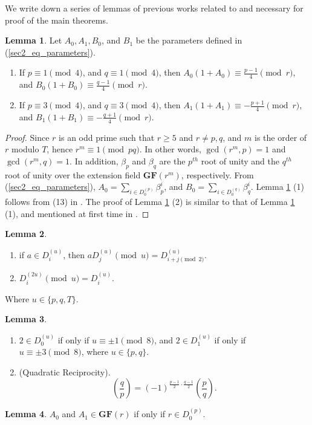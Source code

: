\documentclass{mcom-l}
\theoremstyle{definition}
\newtheorem{sec2lemma1x}{Lemma}[section]
\newtheorem{sec2lemma2x}[sec2lemma1x]{Lemma}
\newtheorem{sec2lemma3x}[sec2lemma1x]{Lemma}
\newtheorem{sec2lemma4x}[sec2lemma1x]{Lemma}
\numberwithin{equation}{section}
\begin{document}
    We write down a series of lemmas of previous works related to and necessary for proof of the main theorems.
    \begin{sec2lemma1x}\label{lab_sec2_lemma1x}Let $ A_{0},A_{1},B_{0} $, and $ B_{1} $ be the parameters defined in (\ref{sec2_eq_parameters}).
     \begin{enumerate} \item If $ p\equiv 1 \pmod 4 $, and $ q\equiv 1 \pmod 4 $, then $ A_{0}(1+A_{0}) \equiv \frac{p-1}{4} \pmod r$, and $ B_{0}(1+B_{0}) \equiv \frac{q-1}{4} \pmod r$.
     \item If $ p\equiv 3 \pmod 4 $, and $ q\equiv 3 \pmod 4 $, then $ A_{1}(1+A_{1}) \equiv -\frac{p+1}{4} \pmod r$, and $ B_{1}(1+B_{1}) \equiv -\frac{q+1}{4} \pmod r$.
     \end{enumerate}
     \end{sec2lemma1x}
     \begin{proof}
     Since $ r $ is an odd prime such that $ r\geq 5 $ and $ r\ne p,q $, and $ m $ is the order of $ r $ modulo $ T $, hence $ r^{m}\equiv 1\pmod{ pq} $. In other words, $ \gcd(r^{m},p)=1 $ and $ \gcd(r^{m},q)=1 $. In addition, $ \beta_{p} $ and $ \beta_{q} $ are the $ p^{th} $ root of unity and the $ q^{th} $ root of unity over the extension field $ \mathbf{GF}(r^{m}) $, respectively. From    (\ref{sec2_eq_parameters}), $  A_{0}= \sum_{i\in D_{0}^{(p)}}\beta^{i}_{p} $, and $ B_{0}= \sum_{i\in D_{0}^{(q)}}\beta^{i}_{q} $. Lemma \ref{lab_sec2_lemma1x} (1) follows from (13) in \cite{B4}. The proof of Lemma \ref{lab_sec2_lemma1x} (2) is similar to that of Lemma \ref{lab_sec2_lemma1x} (1), and mentioned at first time in \cite{B18}.
     \end{proof}
    \begin{sec2lemma2x}\cite{B10,B13}\label{lab_sec2_lemma2x}
    \begin{enumerate} \item if $ a\in D_{i}^{(u)} $, then $ aD_{j}^{(u)}\pmod u = D_{i+j \pmod 2}^{(u)} $.
    \item $ D_{i}^{(2u)}\pmod u = D_{i}^{(u)} $.
    \end{enumerate}
    \end{sec2lemma2x} 
    Where $ u\in\lbrace p,q,T\rbrace $. 
    \begin{sec2lemma3x}\cite{B19}\label{lab_sec2_lemma3x}
     \begin{enumerate} \item 
    $ 2\in D_{0}^{(u)} $ if only if $ u\equiv\pm 1\pmod 8  $, and $ 2\in D_{1}^{(u)} $ if only if $ u\equiv\pm 3\pmod 8  $, where $ u\in\lbrace p,q\rbrace $.
     \item
     (Quadratic Reciprocity).
     \begin{equation*}
     \left(\frac{q}{p}\right)= (-1)^{\frac{p-1}{2}\cdot \frac{q-1}{2}}\left(\frac{p}{q}\right).
     \end{equation*}
    \end{enumerate}
    \end{sec2lemma3x}
    \begin{sec2lemma4x}\cite{B14}\label{lab_sec2_lemma4x}
     $ A_{0} $ and $ A_{1} \in \mathbf{GF}(r)$ if only if $ r\in  D_{0}^{(p)}$.
    \end{sec2lemma4x}
\end{document}

